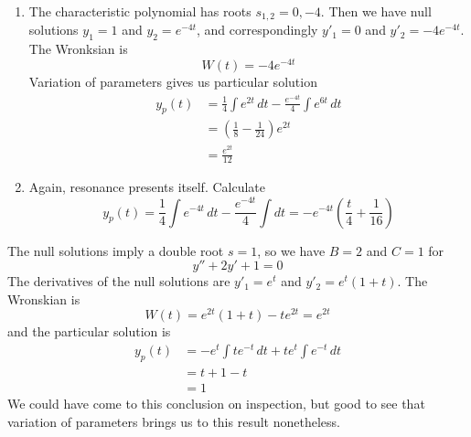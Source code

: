 \documentclass[a4paper]{article}
\begin{document}
\begin{enumerate}[label=(\alph*)]
	\item The characteristic polynomial has roots \( s_{1,2} = 0, -4 \). Then we have null solutions \( y_{1} = 1  \) and \( y_{2} = e^{-4t} \), and correspondingly \( y'_{1} = 0 \) and \( y'_{2} = -4e^{-4t} \). The Wronksian is
\[
	W \!\left( t  \right) = -4e^{-4t} 
\]
Variation of parameters gives us particular solution
\begin{align*}
	y_{p }\!\left( t  \right) & = \frac{1}{4}\int e^{2t} \, dt - \frac{e^{-4t}}{4} \int e^{6t} \, dt \\
				  & = \!\left( \frac{1}{8} - \frac{1}{24} \right)e^{2t} \\
				  & = \frac{e^{2t}}{12}
\end{align*}
	\item Again, resonance presents itself. Calculate
	\[
		y_{p }\!\left( t  \right) = \frac{1}{4} \int e^{-4t} \, dt - \frac{e^{-4t}}{4} \int dt = -e^{-4t} \!\left( \frac{t }{4} + \frac{1}{16} \right)
	\]
\end{enumerate}


The null solutions imply a double root \( s = 1 \), so we have \( B = 2 \) and \( C = 1 \) for 
\[
	 y'' + 2y' + 1 = 0
\]
The derivatives of the null solutions are \( y'_{1} = e^{t } \) and \( y'_{2} = e^{t } \!\left( 1 + t \right) \). The Wronskian is
\[
	W \!\left( t  \right) = e^{2t}\!\left( 1 + t  \right) - te^{2t} = e^{2t}
\]
and the particular solution is
\begin{align*}
	y_{p }\!\left( t  \right) & = -e^{t } \int te^{-t } \, dt + te^{t } \int e^{-t } \, dt \\
				  & = t + 1 - t \\
				  & = 1
\end{align*}
We could have come to this conclusion on inspection, but good to see that variation of parameters brings us to this result nonetheless.

\vspace{12pt}

\end{document}

